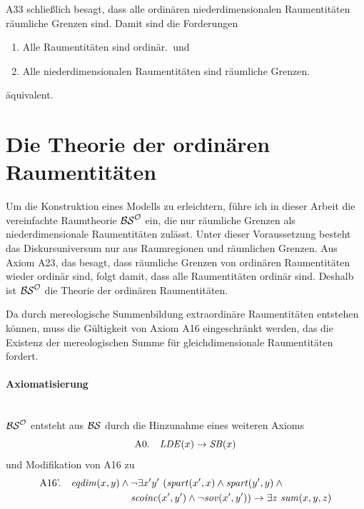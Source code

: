     A33
    schließlich besagt, dass alle ordinären niederdimensionalen Raumentitäten räumliche Grenzen sind.
    Damit sind die Forderungen
    \begin{enumerate}
     \item \glqq Alle Raumentitäten sind ordinär.\grqq\ und
     \item \glqq Alle niederdimensionalen Raumentitäten sind räumliche Grenzen.\grqq
    \end{enumerate}
    äquivalent.


    
\section{Die Theorie der ordinären Raumentitäten}\label{sec:bso}
Um die Konstruktion eines Modells zu erleichtern, führe ich in dieser Arbeit die vereinfachte Raumtheorie $\mathcal{BS}^{\mathcal{O}}$ ein, die nur räumliche Grenzen als niederdimensionale Raumentitäten zulässt.
Unter dieser Voraussetzung besteht das Diskursuniversum nur aus Raumregionen und räumlichen Grenzen.
Aus Axiom A23, das besagt, dass räumliche Grenzen von ordinären Raumentitäten wieder ordinär sind, folgt damit, dass alle Raumentitäten ordinär sind.
Deshalb ist $\mathcal{BS}^{\mathcal{O}}$ die Theorie der ordinären Raumentitäten.

Da durch mereologische Summenbildung extraordinäre Raumentitäten entstehen können, muss die Gültigkeit von Axiom A16 eingeschränkt werden, das die Existenz der mereologischen Summe für gleichdimensionale Raumentitäten fordert.

\paragraph{Axiomatisierung}\ \\
$\mathcal{BS}^{\mathcal{O}}$ entsteht aus $\mathcal{BS}$ durch die Hinzunahme eines weiteren Axioms
$$\text{A0.} \quad \mathit{LDE}(x) \to \mathit{S\hspace*{-0.25ex}B}(x)$$
und Modifikation von A16 zu
\begin{align*}
 \text{A16'.} \quad \Geqdim(x,y) \wedge \mbox{} &\neg \exists x'y'\ (\Gspart(x',x) \wedge \Gspart(y',y) \wedge \mbox{} \\
 &\Gscoinc(x',y') \wedge \neg \Gsov(x',y')) \to \exists z\ \Gsum(x,y,z)
\end{align*}


